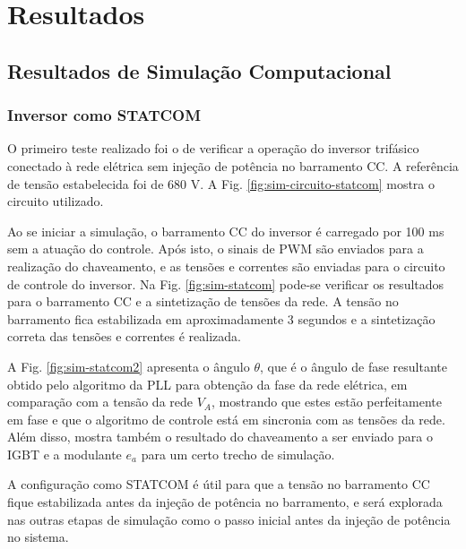 \chapter{Resultados}

\section{Resultados de Simulação Computacional}

\subsection{Inversor como STATCOM}

O primeiro teste realizado foi o de verificar a operação do inversor trifásico conectado 
à rede elétrica sem injeção de potência no barramento CC. A referência de tensão estabelecida foi de 680 V.
A Fig. \ref{fig:sim-circuito-statcom} mostra o circuito utilizado.

Ao se iniciar a simulação, o barramento CC do inversor é carregado por 100 ms sem a atuação do controle. 
Após isto, o sinais de PWM são enviados para a realização do chaveamento, e as tensões e correntes são enviadas para o circuito de controle do inversor.
Na Fig. \ref{fig:sim-statcom} pode-se verificar os resultados para o barramento CC e a sintetização de tensões da rede.
A tensão no barramento fica estabilizada em aproximadamente 3 segundos e a sintetização correta das tensões e correntes é realizada.

A Fig. \ref{fig:sim-statcom2} apresenta o ângulo $\theta$, que é o ângulo de fase resultante obtido pelo algoritmo da PLL para obtenção da fase da rede elétrica, 
em comparação com a tensão da rede $V_A$, mostrando que estes estão perfeitamente em fase e que o algoritmo de controle está em sincronia com as tensões da rede.
Além disso, mostra também o resultado do chaveamento a ser enviado para o IGBT e a modulante $e_a$ para um certo trecho de simulação.

A configuração como STATCOM é útil para que a tensão no barramento CC fique estabilizada antes da injeção de potência no barramento, 
e será explorada nas outras etapas de simulação como o passo inicial antes da injeção de potência no sistema.

